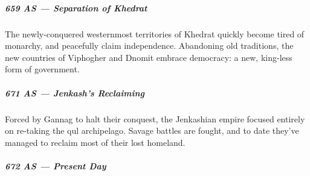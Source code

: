 \begin{linenumbers}
\subparagraph{659 AS --- Separation of Khedrat} The newly-conquered westernmost territories of Khedrat quickly become tired of monarchy, and peacefully claim independence.
Abandoning old traditions, the new countries of Viphogher and Dnomit embrace democracy: a new, king-less form of government.

\subparagraph{671 AS --- Jenkash's Reclaiming} Forced by Gannag to halt their conquest, the Jenkashian empire focused entirely on re-taking the qul archipelago.
Savage battles are fought, and to date they've managed to reclaim most of their lost homeland.

\subparagraph{672 AS --- Present Day}
\newpage

\end{linenumbers}
